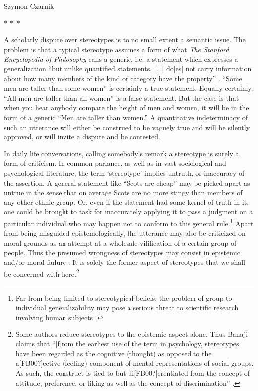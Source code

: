 \begin{artengenv}{Szymon Czarnik}
\begin{center}
$ {\ast}\,{\ast}\,{\ast} $
\end{center}


A scholarly dispute over stereotypes is to no small extent a semantic issue. The problem is that a typical stereotype assumes a form of what \textit{The Stanford Encyclopedia of Philosophy} calls a generic, i.e. a statement which expresses a generalization ``but unlike quantified statements, [...] do[es] not carry information about how many members of the kind or category have the property''
\parencite[][]{leslie_generic_2016}. %
 ``Some men are taller than some women'' is certainly a true statement. Equally certainly, ``All men are taller than all women'' is a false statement. But the case is that when you hear anybody compare the height of men and women, it will be in the form of a generic ``Men are taller than women.'' A quantitative indeterminacy of such an utterance will either be construed to be vaguely true and will be silently approved, or will invite a dispute and be contested.

\enlargethispage{.7\baselineskip}
In daily life conversations, calling somebody's remark a stereotype is surely a form of criticism. In common parlance, as well as in vast sociological and psychological literature, the term ‘stereotype' implies untruth, or inaccuracy of the assertion. A general statement like ``Scots are cheap'' may be picked apart as untrue in the sense that on average Scots are no more stingy than members of any other ethnic group. Or, even if the statement had some kernel of truth in it, one could be brought to task for inaccurately applying it to pass a judgment on a particular individual who may happen not to conform to this general rule.\footnote{Far from being limited to stereotypical beliefs, the problem of group-to-individual generalizability may pose a serious threat to scientific research involving human subjects
\parencite[][]{fisher_lack_2018}.%
} Apart from being misguided epistemologically, the utterance may also be criticized on moral grounds as an attempt at a wholesale vilification of a certain group of people. Thus the presumed wrongness of stereotypes may consist in epistemic and/or moral failure 
\parencite[][]{beeghly_seeing_2014}. %
 It is solely the former aspect of stereotypes that we shall be concerned with here.\footnote{Some authors reduce stereotypes to the epistemic aspect alone. Thus Banaji claims that ``[f]rom the earliest use of the term in psychology, stereotypes have been regarded as the cognitive (thought) as opposed to the a[FB00?]ective (feeling) component of mental representations of social groups. As such, the construct is tied to but di[FB00?]erentiated from the concept of attitude, preference, or liking as well as the concept of discrimination'' 
\parencite[][p.15101]{banaji_stereotypes_2001}. %
 }


\end{artengenv}
